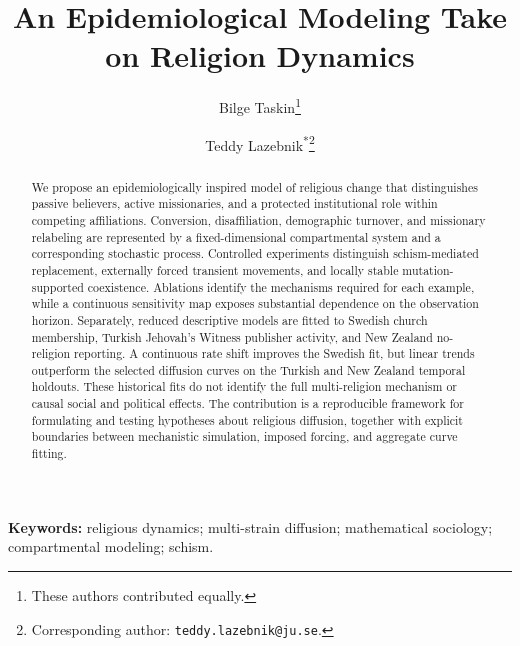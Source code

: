 \documentclass[11pt,a4paper]{article}
\title{An Epidemiological Modeling Take on Religion Dynamics}
\author[1]{Bilge Taskin\thanks{These authors contributed equally.}}
\author[1,2]{Teddy Lazebnik\textsuperscript{*}\thanks{Corresponding author: \texttt{teddy.lazebnik@ju.se}.}}
\affil[1]{Department of Computing, J\"onk\"oping University, J\"onk\"oping, Sweden}
\affil[2]{Department of Information Systems, University of Haifa, Haifa, Israel}
\date{}
\begin{document}
\maketitle
\begin{abstract}
We propose an epidemiologically inspired model of religious change that distinguishes passive believers, active missionaries, and a protected institutional role within competing affiliations. Conversion, disaffiliation, demographic turnover, and missionary relabeling are represented by a fixed-dimensional compartmental system and a corresponding stochastic process. Controlled experiments distinguish schism-mediated replacement, externally forced transient movements, and locally stable mutation-supported coexistence. Ablations identify the mechanisms required for each example, while a continuous sensitivity map exposes substantial dependence on the observation horizon. Separately, reduced descriptive models are fitted to Swedish church membership, Turkish Jehovah's Witness publisher activity, and New Zealand no-religion reporting. A continuous rate shift improves the Swedish fit, but linear trends outperform the selected diffusion curves on the Turkish and New Zealand temporal holdouts. These historical fits do not identify the full multi-religion mechanism or causal social and political effects. The contribution is a reproducible framework for formulating and testing hypotheses about religious diffusion, together with explicit boundaries between mechanistic simulation, imposed forcing, and aggregate curve fitting.
\end{abstract}
\noindent\textbf{Keywords:} religious dynamics; multi-strain diffusion; mathematical sociology; compartmental modeling; schism.
\end{document}
